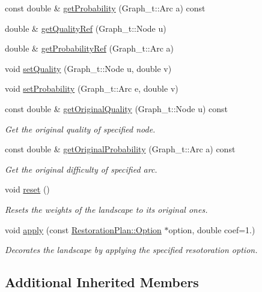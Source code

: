 \begin{DoxyCompactItemize}
const double \& \hyperlink{class_decored_landscape_a09b5ea325960556e0a834a53a7b53000}{get\+Probability} (Graph\+\_\+t\+::\+Arc a) const
\item 
double \& \hyperlink{class_decored_landscape_a2c6557a008e3b8a6d93bf307a71a1b33}{get\+Quality\+Ref} (Graph\+\_\+t\+::\+Node u)
\item 
double \& \hyperlink{class_decored_landscape_a16bd4da5d77b804cecb864c11770a344}{get\+Probability\+Ref} (Graph\+\_\+t\+::\+Arc a)
\item 
void \hyperlink{class_decored_landscape_a76d4269a5c48601b0a31dbf91b3cbafe}{set\+Quality} (Graph\+\_\+t\+::\+Node u, double v)
\item 
void \hyperlink{class_decored_landscape_a53063f0f592b1cd00c3456fd40722c53}{set\+Probability} (Graph\+\_\+t\+::\+Arc e, double v)
\item 
const double \& \hyperlink{class_decored_landscape_a136c0034f2953fd59332d73b6eb17b19}{get\+Original\+Quality} (Graph\+\_\+t\+::\+Node u) const
\begin{DoxyCompactList}\small\item\em Get the original quality of specified node. \end{DoxyCompactList}\item 
const double \& \hyperlink{class_decored_landscape_af45ece8a6787d42c0d60c90de913b9f5}{get\+Original\+Probability} (Graph\+\_\+t\+::\+Arc a) const
\begin{DoxyCompactList}\small\item\em Get the original difficulty of specified arc. \end{DoxyCompactList}\item 
void \hyperlink{class_decored_landscape_a9acf573f999cbf3e96fb567a89d02a1b}{reset} ()
\begin{DoxyCompactList}\small\item\em Resets the weights of the landscape to its original ones. \end{DoxyCompactList}\item 
void \hyperlink{class_decored_landscape_a4613b09e1b8d817095dd486f9c1224b8}{apply} (const \hyperlink{class_restoration_plan_1_1_option}{Restoration\+Plan\+::\+Option} $\ast$option, double coef=1.)
\begin{DoxyCompactList}\small\item\em Decorates the landscape by applying the specified resotoration option. \end{DoxyCompactList}\end{DoxyCompactItemize}
\subsection*{Additional Inherited Members}


